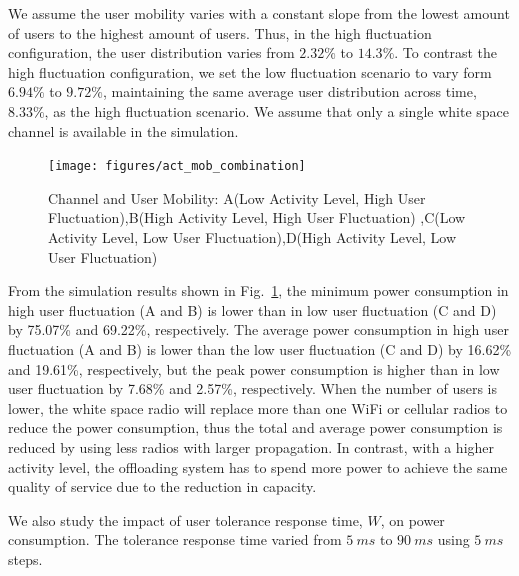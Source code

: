 We assume the user mobility varies with a constant slope from the lowest amount of users to the highest amount of users. 
Thus, in the high fluctuation configuration, the user distribution varies from $2.32\%$ to $14.3\%$. 
To contrast the high fluctuation configuration, we set the low fluctuation scenario to vary form $6.94\%$ to $9.72\%$, maintaining the same average user distribution across time, $8.33\%$, as the high fluctuation scenario. 
We assume that only a single white space channel is available in the simulation.


\begin{figure}
\vspace{-0.0in}
\centering
\texttt{[image: figures/act\_mob\_combination]}
\vspace{-0.1in}
\caption{Channel and User Mobility: A(Low Activity Level, High User Fluctuation),B(High Activity Level, High User Fluctuation)
,C(Low Activity Level, Low User Fluctuation),D(High Activity Level, Low User Fluctuation)}
\label{fig:act_mob_combination}
\vspace{-0.3in}
\end{figure}

From the simulation results shown in Fig.~\ref{fig:act_mob_combination}, the minimum power consumption in high user fluctuation (A and B) is lower than in low user fluctuation (C and D) by 75.07\% and 69.22\%, respectively.
The average power consumption in high user fluctuation (A and B) is lower than the low user fluctuation (C and D) by 16.62\% and 19.61\%, respectively, but the peak power consumption is higher than in low user fluctuation by 7.68\% and 2.57\%, respectively. 
When the number of users is lower, the white space radio will replace more than one WiFi or cellular radios to reduce the power consumption, thus the total and average power consumption is reduced by using less radios with larger propagation.
In contrast, with a higher activity level, the offloading system has to spend more power to achieve the same quality of service due to the reduction in capacity. 


We also study the impact of user tolerance response time, $W$, on power consumption. 
The tolerance response time varied from $5\ ms$ to $90\ ms$ using $5\ ms$ steps. 
 
